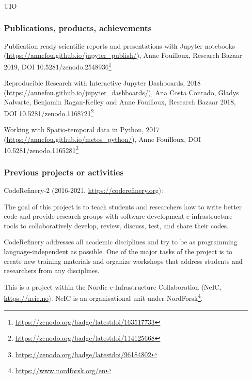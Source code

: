 \begin{sitedescription}{UIO}
\subsubsection*{Publications, products, achievements}

\begin{compactenum}
\item Publication ready scientific reports and presentations with Jupyter notebooks (\url{https://annefou.github.io/jupyter_publish/}), Anne Fouilloux, Research Bazaar 2019, DOI 10.5281/zenodo.2548936\footnote{\url{https://zenodo.org/badge/latestdoi/163517733}}

\item Reproducible Research with Interactive Jupyter Dashboards, 2018 (\url{https://annefou.github.io/jupyter_dashboards/}), Ana Costa Conrado, Gladys Nalvarte, Benjamin Ragan-Kelley and Anne Fouilloux, Research Bazaar 2018, DOI 10.5281/zenodo.1168721\footnote{\url{https://zenodo.org/badge/latestdoi/114125668}}

\item Working with Spatio-temporal data in Python, 2017 (\url{https://annefou.github.io/metos_python/}), Anne Fouilloux, DOI 10.5281/zenodo.1165281\footnote{\url{https://zenodo.org/badge/latestdoi/96184802}}
\end{compactenum}

\subsubsection*{Previous projects or activities}

\begin{compactenum}
\item CodeRefinery-2 (2016-2021, \url{https://coderefinery.org}): 

The goal of this project is to teach students and researchers how to write better code and provide research groups with software development e-infrastructure tools to collaboratively develop, review, discuss, test, and share their codes.

CodeRefinery addresses all academic disciplines and try to be as programming language-independent as possible. One of the major tasks of the project is to create new training materials and organize workshops that address students and researchers from any disciplines.

This is a project within the Nordic e-Infrastructure Collaboration (NeIC, \url{https://neic.no}). NeIC is an organisational unit under NordForsk\footnote{\url{https://www.nordforsk.org/en}}.


\end{compactenum}
\end{sitedescription}
